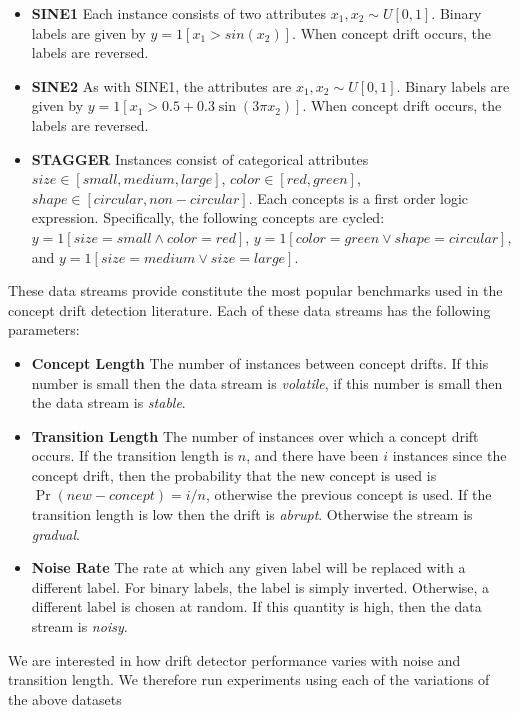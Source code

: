 \begin{itemize}
    \item {\bf SINE1} Each instance consists of two attributes $x_1,x_2\sim U[0,1]$. Binary labels are given by $y = \mathrm{1}[x_1>sin(x_2)]$. When concept drift occurs, the labels are reversed.
    \item {\bf SINE2} As with SINE1, the attributes are $x_1,x_2\sim U[0,1]$. Binary labels are given by $y = \mathrm{1}[x_1>0.5+0.3\sin(3\pi x_2)]$. When concept drift occurs, the labels are reversed.
    \item {\bf STAGGER} Instances consist of categorical attributes $size\in [small, medium, large]$, $color\in [red, green]$, $shape\in [circular, non-circular]$. Each concepts is a first order logic expression. Specifically, the following concepts are cycled: $y=\mathrm{1}[size=small \wedge color=red]$, $y=\mathrm{1}[color=green \vee shape=circular]$, and $y=\mathrm{1}[size=medium \vee size=large]$.
\end{itemize}
These data streams provide constitute the most popular benchmarks used in the concept drift detection literature. Each of these data streams has the following parameters:
\begin{itemize}
    \item {\bf Concept Length} The number of instances between concept drifts. If this number is small then the data stream is {\it volatile}, if this number is small then the data stream is {\it stable}.
    \item {\bf Transition Length} The number of instances over which a concept drift occurs. If the transition length is $n$, and there have been $i$ instances since the concept drift, then the probability that the new concept is used is $\Pr(new-concept)=i/n$, otherwise the previous concept is used. If the transition length is low then the drift is {\it abrupt}. Otherwise the stream is {\it gradual}.
    \item {\bf Noise Rate} The rate at which any given label will be replaced with a different label. For binary labels, the label is simply inverted. Otherwise, a different label is chosen at random. If this quantity is high, then the data stream is {\it noisy}.
\end{itemize}
We are interested in how drift detector performance varies with noise and transition length. We therefore run experiments using each of the variations of the above datasets
